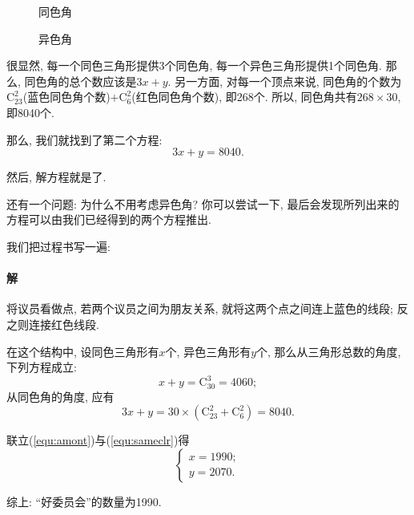\documentclass{article}
\begin{document}
\begin{figure}[htbp]%
	\begin{minipage}{0.5\textwidth}
		\centering
		\caption{同色角}
		\label{fig:sameclrangle}
	\end{minipage}
	\begin{minipage}{0.5\textwidth}
		\centering
		\caption{异色角}
		\label{fig:diffclrangle}
	\end{minipage}
\end{figure}
\par 很显然, 每一个同色三角形提供3个同色角, 每一个异色三角形提供1个同色角. 那么, 同色角的总个数应该是$3x+y$. 另一方面, 对每一个顶点来说, 同色角的个数为$\mathrm{C}_{23}^2$(蓝色同色角个数)$+\mathrm{C}_6^2$(红色同色角个数), 即268个. 所以, 同色角共有$268\times30$, 即8040个. 
\par 那么, 我们就找到了第二个方程: 
\[3x+y=8040.\]
\par 然后, 解方程就是了.
\par 还有一个问题: 为什么不用考虑异色角? 你可以尝试一下, 最后会发现所列出来的方程可以由我们已经得到的两个方程推出.
\par 我们把过程书写一遍:
\paragraph{解}将议员看做点, 若两个议员之间为朋友关系, 就将这两个点之间连上蓝色的线段; 反之则连接红色线段.
\par 在这个结构中, 设同色三角形有$x$个, 异色三角形有$y$个, 那么从三角形总数的角度, 下列方程成立:
\begin{equation}\label{equ:amont}
	x+y=\mathrm{C}_{30}^3=4060 ;
\end{equation}
从同色角的角度, 应有
\begin{equation}\label{equ:sameclr}
	3x+y=30\times(\mathrm{C}_{23}^2+\mathrm{C}_6^2)=8040 .
\end{equation}
\par 联立(\ref{equ:amont})与(\ref{equ:sameclr})得
\[\begin{cases}
	x=1990 ;\\y=2070 .
\end{cases}\]
\par 综上: “好委员会”的数量为1990.
\end{document}
